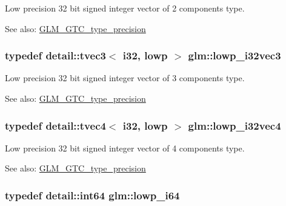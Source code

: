 Low precision 32 bit signed integer vector of 2 components type. \begin{Desc}
\item[See also:]\hyperlink{group__gtc__type__precision}{GLM\_\-GTC\_\-type\_\-precision} \end{Desc}
\hypertarget{group__gtc__type__precision_ga4a0dd64d4253a3641225254670c7b95}{
\subsubsection[lowp\_\-i32vec3]{\setlength{\rightskip}{0pt plus 5cm}typedef detail::tvec3$<$ i32, lowp $>$ {\bf glm::lowp\_\-i32vec3}}}
\label{group__gtc__type__precision_ga4a0dd64d4253a3641225254670c7b95}


Low precision 32 bit signed integer vector of 3 components type. \begin{Desc}
\item[See also:]\hyperlink{group__gtc__type__precision}{GLM\_\-GTC\_\-type\_\-precision} \end{Desc}
\hypertarget{group__gtc__type__precision_g99adefeda08a56345b0553d13283d2fa}{
\subsubsection[lowp\_\-i32vec4]{\setlength{\rightskip}{0pt plus 5cm}typedef detail::tvec4$<$ i32, lowp $>$ {\bf glm::lowp\_\-i32vec4}}}
\label{group__gtc__type__precision_g99adefeda08a56345b0553d13283d2fa}


Low precision 32 bit signed integer vector of 4 components type. \begin{Desc}
\item[See also:]\hyperlink{group__gtc__type__precision}{GLM\_\-GTC\_\-type\_\-precision} \end{Desc}
\hypertarget{group__gtc__type__precision_g1f4ded25f71c0f3b4518936d50b54b6e}{
\subsubsection[lowp\_\-i64]{\setlength{\rightskip}{0pt plus 5cm}typedef detail::int64 {\bf glm::lowp\_\-i64}}}
\label{group__gtc__type__precision_g1f4ded25f71c0f3b4518936d50b54b6e}


